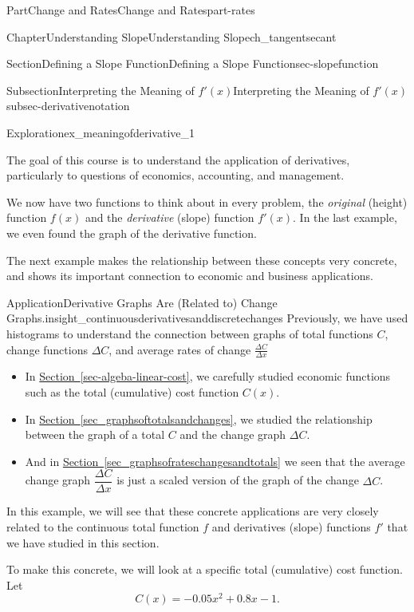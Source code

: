 \documentclass[oneside,10pt,]{tufte-book}
\newcommand{\xreffont}{\relax}
\numberwithin{equation}{chapter}
\begin{document}
\begin{partptx}{Part}{Change and Rates}{}{Change and Rates}{}{}{part-rates}
\begin{chapterptx}{Chapter}{Understanding Slope}{}{Understanding Slope}{}{}{ch_tangentsecant}
\begin{sectionptx}{Section}{Defining a Slope Function}{}{Defining a Slope Function}{}{}{sec-slopefunction}
\begin{subsectionptx}{Subsection}{Interpreting the Meaning of \(f'(x)\)}{}{Interpreting the Meaning of \(f'(x)\)}{}{}{subsec-derivativenotation}
\begin{exploration}{Exploration}{}{ex_meaningofderivative_1}
\begin{enumerate}[font=\bfseries,label=(\alph*),ref=\alph*]
\end{enumerate}%
\end{exploration}%
\end{subsectionptx}
The goal of this course is to understand the application of derivatives, particularly to questions of economics, accounting, and management.%
\par
We now have two functions to think about in every problem, the \emph{original} (height) function \(f(x)\) and the \emph{derivative} (slope) function \(f'(x)\). In the last example, we even found the graph of the derivative function.%
\par
The next example makes the relationship between these concepts very concrete, and shows its important connection to economic and business applications.%
\begin{insight}{Application}{Derivative Graphs Are (Related to) Change Graphs.}{insight_continuousderivativesanddiscretechanges}%
Previously, we have used histograms to understand the connection between graphs of total functions \(C\), change functions \(\Delta C\), and average rates of change \(\frac{\Delta C}{\Delta x}\)%
\begin{itemize}[label=\textbullet]
\item{}In \hyperref[sec-algeba-linear-cost]{Section~{\xreffont\ref{sec-algeba-linear-cost}}}, we carefully studied economic functions such as the total (cumulative) cost function  \(C(x)\).%
\item{}In \hyperref[sec_graphsoftotalsandchanges]{Section~{\xreffont\ref{sec_graphsoftotalsandchanges}}}, we studied the relationship between the graph of a total \(C\) and the change graph \(\Delta C\).%
\item{}And in \hyperref[sec_graphsofrateschangesandtotals]{Section~{\xreffont\ref{sec_graphsofrateschangesandtotals}}} we seen that the average change graph \(\dfrac{\Delta C}{\Delta x}\) is just  a scaled version of the graph of the change \(\Delta C\).%
\end{itemize}
%
\par
In this example, we will see that these  concrete applications are very closely related to the continuous total function \(f\) and  derivatives (slope) functions \(f'\) that we have studied in this section.%
\par
To make this concrete, we will look at a specific total (cumulative) cost function.  Let%
\begin{equation*}
C(x) = -0.05 x^2 + 0.8 x - 1\text{.}
\end{equation*}

\end{insight}
\end{sectionptx}
\end{chapterptx}
\end{partptx}
\end{document}
